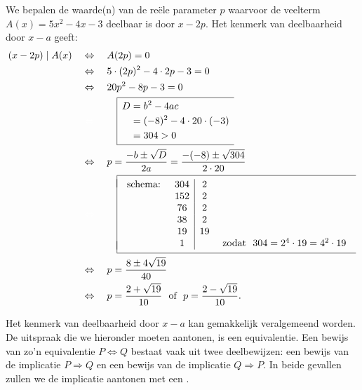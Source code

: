 \documentclass{ximera}
\begin{document}
\begin{voorbeeld}
We bepalen de waarde(n) van de re\"ele parameter $p$ waarvoor de veelterm $A(x) = 5x^2-4x-3$ deelbaar is door $x-2p$. Het kenmerk van deelbaarheid door $x-a$ geeft:
\begin{align*}
(x-2p) \mid A(x) \quad 
& \Leftrightarrow \quad A(2p) = 0 \\
& \Leftrightarrow \quad 5 \cdot (2p)^2 - 4 \cdot 2p - 3 = 0 \\
& \Leftrightarrow \quad 20p^2 - 8p - 3 = 0 \\
& \mph{\Leftrightarrow} \qquad 
\begin{array}{|l}
\hline
\begin{aligned}
\vrule height 0.4cm width 0cm
D & = b^2-4ac \\[0.1cm]
& = (-8)^2-4 \cdot 20 \cdot (-3) \\[0.1cm]
& = 304 > 0 \\[0.1cm]
\end{aligned} \\
\hline
\end{array} \\
& \Leftrightarrow \quad p = \frac{-b \pm \sqrt{D}}{2a} = \frac{-(-8) \pm \sqrt{304}}{2 \cdot 20} \\
& \mph{\Leftrightarrow} \qquad 
\begin{array}{|l}
\hline
\mbox{} \\[-0.3cm]
\begin{array}{lc|cr}
\text{schema: } & 304 & 2 \\
& 152 & 2 \\
& 76 & 2 \\
& 38 & 2 \\
& 19 & 19 \\
& 1 & & \text{ zodat } \,\, 304 = 2^4 \cdot 19 = 4^2 \cdot 19
\end{array}\\[-0.3cm]
\mbox{} \\
\hline
\end{array} \\
& \Leftrightarrow \quad p = \frac{8 \pm 4\sqrt{19}}{40} \\
& \Leftrightarrow \quad p = \frac{2 + \sqrt{19}}{10} \,\, \text{ of } \,\, p = \frac{2 - \sqrt{19}}{10}.
\end{align*}
\end{voorbeeld}

Het kenmerk van deelbaarheid door $x-a$ kan gemakkelijk veralgemeend worden. De uitspraak die we hieronder moeten aantonen, is een equivalentie. Een bewijs van zo'n equivalentie $P \Leftrightarrow Q$ bestaat vaak uit twee deelbewijzen: een bewijs van de implicatie $P \Rightarrow Q$ en een bewijs van de implicatie $Q \Rightarrow P$. In beide gevallen zullen we de implicatie aantonen met een .
\end{document}
